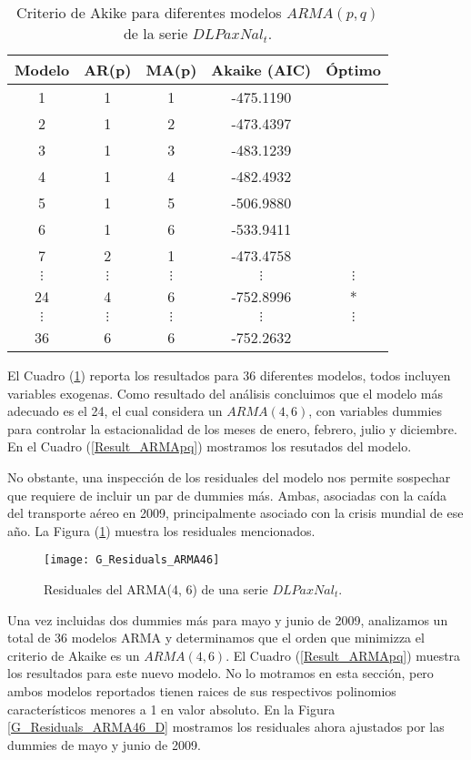 \documentclass[
  a4paper,
]{article}
\begin{document}
\begin{table}
\centering
\begin{tabular}{|c | c | c | c | c |}
\hline
    Modelo & AR(p) & MA(p) & Akaike (AIC) & Óptimo \\
\hline
    1 & 1 & 1 & -475.1190 &  \\
    2 & 1 & 2 & -473.4397 &  \\
    3 & 1 & 3 & -483.1239 &  \\
    4 & 1 & 4 & -482.4932 &  \\
    5 & 1 & 5 & -506.9880 &  \\
    6 & 1 & 6 & -533.9411 &  \\
    7 & 2 & 1 & -473.4758 &  \\
    $\vdots$ & $\vdots$ & $\vdots$ & $\vdots$ & $\vdots$ \\
    24 & 4 & 6 & -752.8996 & * \\
    $\vdots$ & $\vdots$ & $\vdots$ & $\vdots$ & $\vdots$ \\
    36 & 6 & 6 & -752.2632 &  \\
\hline
\end{tabular}
\caption{Criterio de Akike para diferentes modelos $ARMA(p, q)$ de la serie $DLPaxNal_t$.}
\label{Selec_ARMApq}
\end{table}

El Cuadro (\ref{Selec_ARMApq}) reporta los resultados para 36 diferentes
modelos, todos incluyen variables exogenas. Como resultado del análisis
concluimos que el modelo más adecuado es el 24, el cual considera un
\(ARMA(4, 6)\), con variables dummies para controlar la estacionalidad
de los meses de enero, febrero, julio y diciembre. En el Cuadro
(\ref{Result_ARMApq}) mostramos los resutados del modelo.

No obstante, una inspección de los residuales del modelo nos permite
sospechar que requiere de incluir un par de dummies más. Ambas,
asociadas con la caída del transporte aéreo en 2009, principalmente
asociado con la crisis mundial de ese año. La Figura
(\ref{G_Residuals_ARMA46}) muestra los residuales mencionados.

\begin{figure}
  \centering
    \texttt{[image: G\_Residuals\_ARMA46]}
  \caption{Residuales del ARMA(4, 6) de una serie $DLPaxNal_t$.}
  \label{G_Residuals_ARMA46}
\end{figure}

Una vez incluidas dos dummies más para mayo y junio de 2009, analizamos
un total de 36 modelos ARMA y determinamos que el orden que minimizza el
criterio de Akaike es un \(ARMA(4, 6)\). El Cuadro (\ref{Result_ARMApq})
muestra los resultados para este nuevo modelo. No lo motramos en esta
sección, pero ambos modelos reportados tienen raices de sus respectivos
polinomios característicos menores a 1 en valor absoluto. En la Figura
\ref{G_Residuals_ARMA46_D} mostramos los residuales ahora ajustados por
las dummies de mayo y junio de 2009.
\end{document}

